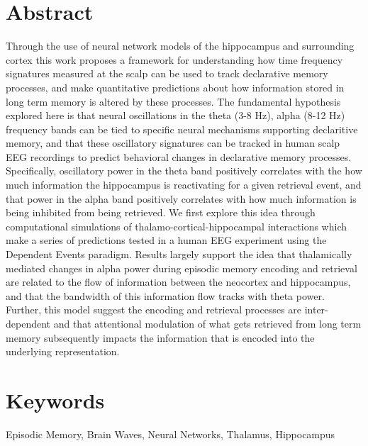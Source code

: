 \documentclass[11pt, titlepage, twoside]{article}
\begin{document}
\section*{Abstract}\label{sec:abstract}
Through the use of neural network models of the hippocampus and surrounding cortex this work proposes a framework for understanding how time frequency signatures measured at the scalp can be used to track declarative memory processes, and make quantitative predictions about how information stored in long term memory is altered by these processes.  The fundamental hypothesis explored here is that neural oscillations in the theta (3-8 Hz), alpha (8-12 Hz) frequency bands can be tied to specific neural mechanisms supporting declaritive memory, and that these oscillatory signatures can be tracked in human scalp EEG recordings to predict behavioral changes in declarative memory processes. Specifically, oscillatory power in the theta band positively correlates with the how much information the hippocampus is reactivating for a given retrieval event, and that power in the alpha band positively correlates with how much information is being inhibited from being retrieved.  We first explore this idea through computational simulations of thalamo-cortical-hippocampal interactions which make a series of predictions tested in a human EEG experiment using the Dependent Events paradigm.  Results largely support the idea that thalamically mediated changes in alpha power during episodic memory encoding and retrieval are related to the flow of information between the neocortex and hippocampus, and that the bandwidth of this information flow tracks with theta power.  Further, this model suggest the encoding and retrieval processes are inter-dependent and that attentional modulation of what gets retrieved from long term memory subsequently impacts the information that is encoded into the underlying representation.

\section*{Keywords}
Episodic Memory, Brain Waves, Neural Networks, Thalamus, Hippocampus
\end{document}
